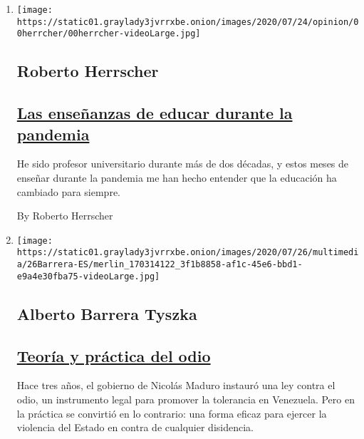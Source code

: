 \begin{enumerate}
\def\labelenumi{\arabic{enumi}.}
\item
  \texttt{[image: https://static01.graylady3jvrrxbe.onion/images/2020/07/24/opinion/00herrcher/00herrcher-videoLarge.jpg]}

  \hypertarget{roberto-herrscher}{%
  \subsection{Roberto Herrscher}\label{roberto-herrscher}}

  \hypertarget{las-enseuxf1anzas-de-educar-durante-la-pandemia}{%
  \subsection{\texorpdfstring{\href{/es/2020/07/27/espanol/opinion/clases-universidad-coronavirus.html}{Las
  enseñanzas de educar durante la
  pandemia}}{Las enseñanzas de educar durante la pandemia}}\label{las-enseuxf1anzas-de-educar-durante-la-pandemia}}

  He sido profesor universitario durante más de dos décadas, y estos
  meses de enseñar durante la pandemia me han hecho entender que la
  educación ha cambiado para siempre.

  By Roberto Herrscher
\item
  \texttt{[image: https://static01.graylady3jvrrxbe.onion/images/2020/07/26/multimedia/26Barrera-ES/merlin\_170314122\_3f1b8858-af1c-45e6-bbd1-e9a4e30fba75-videoLarge.jpg]}

  \hypertarget{alberto-barrera-tyszka}{%
  \subsection{Alberto Barrera Tyszka}\label{alberto-barrera-tyszka}}

  \hypertarget{teoruxeda-y-pruxe1ctica-del-odio}{%
  \subsection{\texorpdfstring{\href{/es/2020/07/26/espanol/opinion/nicmer-evans-venezuela.html}{Teoría
  y práctica del
  odio}}{Teoría y práctica del odio}}\label{teoruxeda-y-pruxe1ctica-del-odio}}

  Hace tres años, el gobierno de Nicolás Maduro instauró una ley contra
  el odio, un instrumento legal para promover la tolerancia en
  Venezuela. Pero en la práctica se convirtió en lo contrario: una forma
  eficaz para ejercer la violencia del Estado en contra de cualquier
  disidencia.


\end{enumerate}
